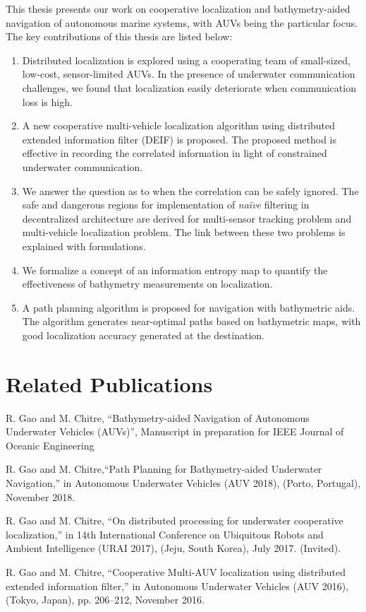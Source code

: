 This thesis presents our work on cooperative localization and bathymetry-aided navigation of autonomous marine systems, with AUVs being the particular focus. The key contributions of this thesis are listed below:
\begin{enumerate}
    \item {Distributed localization is explored 
using a cooperating team of small-sized, low-cost, sensor-limited AUVs. In the presence of underwater communication challenges, we found that localization easily deteriorate when communication loss is high.}
    \item A new cooperative multi-vehicle localization algorithm using distributed extended information filter (DEIF) is proposed. The proposed method is effective in recording the correlated information in light of constrained underwater communication.
    \item {We answer the question as to when the correlation can be safely ignored. The safe and dangerous regions for implementation of \textit{na\"ive} filtering in decentralized architecture are derived for multi-sensor tracking problem and multi-vehicle localization problem. The link between these two problems is explained with formulations.}
    \item We formalize a concept of an information entropy map to quantify the effectiveness of bathymetry measurements on localization.
    \item A path planning algorithm is proposed for navigation with bathymetric aids. The algorithm generates near-optimal paths based on bathymetric maps, with good localization accuracy generated at the destination.  
\end{enumerate}

\section{Related Publications}
\begin{enumerate}[ {[}1{]} ]
\item R. Gao and M. Chitre, ``Bathymetry-aided Navigation of Autonomous Underwater Vehicles (AUVs)'', Manuscript in preparation for IEEE Journal of Oceanic Engineering
     \item R. Gao and M. Chitre,``Path Planning for Bathymetry-aided Underwater Navigation,'' in Autonomous Underwater Vehicles (AUV 2018), (Porto, Portugal), November 2018.
    
    \item R. Gao and M. Chitre, ``On distributed processing for underwater cooperative localization,'' in 14th International Conference on Ubiquitous Robots and Ambient Intelligence (URAI 2017), (Jeju, South Korea), July 2017. (Invited).
    
    \item R. Gao and M. Chitre, ``Cooperative Multi-AUV localization using distributed extended information filter,'' in Autonomous Underwater Vehicles (AUV 2016), (Tokyo, Japan), pp. 206--212, November 2016.
\end{enumerate}

